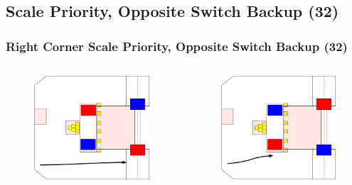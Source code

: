 \documentclass{beamer}
\begin{document}
\subsection{Scale Priority, Opposite Switch Backup (32)}

\begin{frame}
 \frametitle{Right Corner Scale Priority, Opposite Switch Backup \alert{(32)}}
 \begin{columns}
  \begin{figure}
   \includegraphics[scale=0.15]{assets/paths/32_LR}
  \end{figure}
  \begin{figure}
   \includegraphics[scale=0.15]{assets/paths/32_RL}

\end{figure}
\end{columns}
\end{frame}
\end{document}
